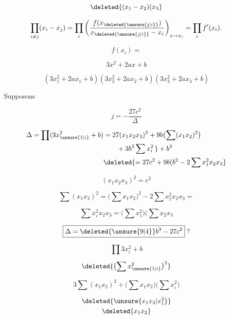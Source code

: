 \[
\deleted{(x_1-x_2)(x_3}
\]

\[
\prod_{i\ne j}(x_i-x_j)=\prod_i\left(\frac{f(x_{\deleted{\unsure{j|i}}})}{x_{\deleted{\unsure{j|i}}}-x_i}\right)_{x\to x_i}=\prod_i f'(x_i).
\]

\[
f(x_i)=
\]

\[
3x^2+2ax+b
\]

\[
(3x_1^2+2ax_1+b)(3x_2^2+2ax_2+b)(3x_3^2+2ax_3+b)
\]

Supposons  

\[
j=-\frac{27c^2}{\Delta}
\]

\[
\begin{aligned}
\Delta=\prod(3x_{\unsure{1|i}}^2+b)&=27(x_1x_2x_3)^2+9b\bigl(\sum(x_1x_2)^2\bigr)\\
&\qquad+3b^2\sum x_i^2\,\}+b^3\\
&\deleted{=27c^2+9b(b^2-2\sum x_1^2x_2x_3}
\end{aligned}
\]

\[
(x_1x_2x_3)^2=c^2
\]

\[
\sum(x_1x_2)^2=\bigl(\sum x_1x_2\bigr)^2-2\sum x_1^2x_2x_3=
\]

\[
\sum x_i^2x_2x_3=\bigl(\sum x_1^2\bigr)\bigl(\sum x_2x_3
\]

\[
\boxed{\Delta=\deleted{\unsure{9|4}}b^3-27c^2}\;?
\]

\[
\prod 3x_i^2+b
\]

\[
\deleted{\bigl(\sum x_{\unsure{1|i}}^2\bigr)^2}
\]

\[
3\sum(x_1x_2)^2+\bigl(\sum x_1x_2\bigr)\bigl(\sum x_i^2\bigr)
\]

\[
\begin{gathered}
\deleted{\unsure{x_1x_2|x_1^2}}\\
\deleted{x_1x_2}
\end{gathered}
\]

